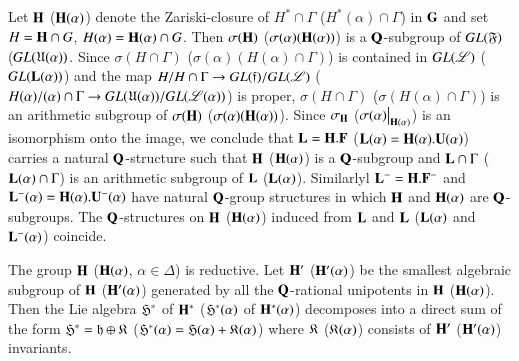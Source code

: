 \subsection{}\label{art9-subsec4.30}
Let $\mathbf{H}$ (\resp $\mathbf{H}(\alpha)$) denote the Zariski-closure of $H^\ast \cap \Gamma$ (\resp $H^\ast(\alpha) \cap \Gamma$) in $\mathbf{G}$ and set $H =\mathbf{H} \cap G$, $H(\alpha) = \mathbf{H} (\alpha) \cap G$. Then $\sigma (\mathbf{H})$ (\resp $\sigma (\alpha) (\mathbf{H} (\alpha))$) is a $\mathbf{Q}$-subgroup of $GL(\mathfrak{F})$ (\resp $GL (\mathfrak{U}(\alpha))$. Since $\sigma (H \cap \Gamma)$ (\resp $\sigma (\alpha) (H(\alpha) \cap \Gamma)$) is contained in $GL (\mathscr{L})$ (\resp $GL (\mathbf{L} (\alpha))$) and the map $H/H \cap \Gamma \to GL (\mathfrak{f})/ GL (\mathscr{L})$ (\resp $H(\alpha)/ (\alpha) \cap \Gamma \to GL (\mathfrak{U} (\alpha))/GL (\mathscr{L} (\alpha))$) is proper, $\sigma (H \cap \Gamma)$ (\resp $\sigma (H (\alpha) \cap \Gamma)$) is an arithmetic subgroup of $\sigma (\mathbf{H})$ (\resp $\sigma (\alpha) (\mathbf{H} (\alpha))$). Since $\sigma_{\mathbf{H}}$ (\resp $\sigma (\alpha) \big|_{\mathbf{H}(\alpha)}$) is an isomorphism onto the image, we conclude that $\mathbf{L} = \mathbf{H}.\mathbf{F}$ (\resp $\mathbf{L} (\alpha) = \mathbf{H} (\alpha). \mathbf{U} (\alpha)$) carries a natural $\mathbf{Q}$-structure such that $\mathbf{H}$ (\resp $\mathbf{H}(\alpha)$) is a $\mathbf{Q}$-subgroup and $\mathbf{L} \cap \Gamma$ (\resp $\mathbf{L} (\alpha) \cap \Gamma$) is an arithmetic subgroup of $\mathbf{L}$ (\resp $\mathbf{L} (\alpha)$). Similarlyl $\mathbf{L}^- = \mathbf{H}. \mathbf{F}^-$ and $\mathbf{L}^-(\alpha) = \mathbf{H} (\alpha). \mathbf{U}^-(\alpha)$ have natural $\mathbf{Q}$-group structures in which $\mathbf{H}$ and $\mathbf{H}(\alpha)$ are $\mathbf{Q}$-subgroups. The $\mathbf{Q}$-structures on $\mathbf{H}$ (\resp $\mathbf{H} (\alpha)$) induced from $\mathbf{L}$ and $\mathbf{L}$ (\resp $\mathbf{L}(\alpha)$ and $\mathbf{L}^-(\alpha)$) coincide.

\setcounter{definition}{30}
\begin{lemma}\label{art9-lem4.31}
The group $\mathbf{H}$ (\resp $\mathbf{H}(\alpha)$, $\alpha \in \Delta$) is reductive. Let $\mathbf{H}'$  (\resp $\mathbf{H}'(\alpha)$) be the smallest algebraic subgroup of $\mathbf{H}$ (\resp $\mathbf{H}'(\alpha)$) generated by all the $\mathbf{Q}$-rational unipotents in $\mathbf{H}$ (\resp $\mathbf{H}(\alpha)$). Then the Lie algebra $\mathfrak{H}^\ast$ of $\mathbf{H}^\ast$ (\resp $\mathfrak{H}^\ast(\alpha)$ of $\mathbf{H}^\ast (\alpha)$) decomposes into a direct sum of the form $\mathfrak{H}^\ast = \mathfrak{h} \oplus \mathfrak{K}$ (\resp $\mathfrak{H}^\ast(\alpha)= \mathfrak{H} (\alpha) + \mathfrak{K}(\alpha)$) where  $\mathfrak{K}$ (\resp $\mathfrak{K} (\alpha)$) consists of $\mathbf{H}'$ (\resp $\mathbf{H}'(\alpha)$) invariants. 
\end{lemma}

\setcounter{subsection}{31}
